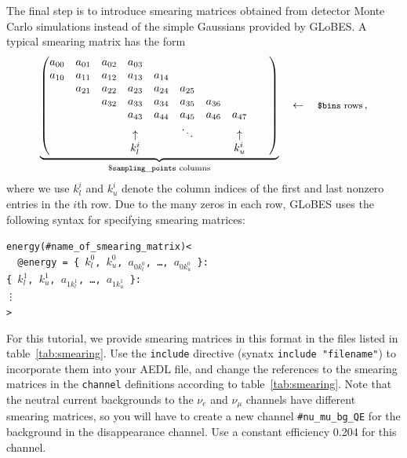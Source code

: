 \documentclass[12pt,a4paper]{article}
\theoremstyle{dotless}
\begin{document}
The final step is to introduce smearing matrices obtained from detector
Monte Carlo simulations instead of the simple Gaussians provided by
GLoBES. A typical smearing matrix has the form
\begin{align}
  \underbrace{
  \begin{pmatrix}
    a_{00} & a_{01} & a_{02} & a_{03} &  &  &  &  &  & \\
    a_{10} & a_{11} & a_{12} & a_{13} & a_{14} &  &  &  &  &  \\
           & a_{21} & a_{22} & a_{23} & a_{24} & a_{25} &  &  &  &  \\
           &  & a_{32} & a_{33} & a_{34} & a_{35} & a_{36} &  &  &  \\
           &  &  & a_{43} & a_{44} & a_{45} & a_{46} & a_{47} &  &  \\
           & & & \uparrow  & & \ddots & & \uparrow & & \\
           & & & k_l^i & & & & k_u^i & &  
  \end{pmatrix}
   }_{\mathtt{\$sampling\_points}  \, \, \text{columns}}
   \quad \leftarrow \quad \text{\footnotesize{{\tt \$bins} rows}} \,,
\end{align}
where we use $k_l^i$ and $k_u^i$ denote the column indices of the
first and last nonzero entries in the $i$th row.
Due to the many zeros in each row, GLoBES uses the following syntax
for specifying smearing matrices:
\begin{tabbing}
  \tt energy(\#name\_of\_smearing\_matrix)<   \\
  \ \ \tt @energy = \=\tt\{ $k^0_l$, $k^0_u$, $a_{0 k^0_l}$, \dots,  $a_{0 k^0_u}$ \}: \\
  \>  \tt                \{ $k^1_l$, $k^1_u$, $a_{1 k^1_l}$, \dots,  $a_{1 k^1_u}$ \}: \\
  \>  \tt             \vdots \\
  \tt >
\end{tabbing}
For this tutorial, we provide smearing matrices in this format
in the files listed in table~\ref{tab:smearing}. Use the {\tt include}
directive (synatx {\tt include "filename"}) to incorporate them
into your AEDL file, and change the references to the smearing matrices
in the {\tt channel} definitions according to table~\ref{tab:smearing}.
Note that the neutral current backgrounds to the $\nu_e$ and $\nu_\mu$
channels have different smearing matrices, so you will have to
create a new channel {\tt \#nu\_mu\_bg\_QE} for the background in the
disappearance channel. Use a constant efficiency 0.204 for this channel.
\end{document}
